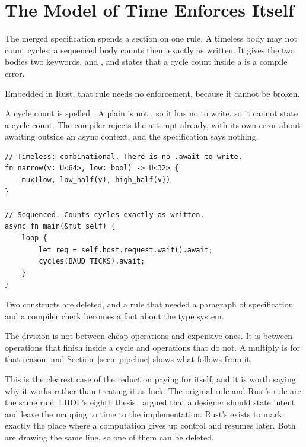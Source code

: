 \section{The Model of Time Enforces Itself}
\label{sec:e-time}

The merged specification spends a section on one rule. A timeless body may
not count cycles; a sequenced body counts them exactly as written. It gives
the two bodies two keywords,  and , and states that a
cycle count inside a  is a compile error.

Embedded in Rust, that rule needs no enforcement, because it cannot be
broken.

A cycle count is spelled . A plain  is not
, so it has no  to write, so it cannot state a
cycle count. The compiler rejects the attempt already, with its own error
about awaiting outside an async context, and the specification says
nothing.

\begin{lstlisting}[caption={The model of time, enforced by the type system. The first function has no \code{.await} to write, so it cannot state a cycle count.},label={lst:time}]
// Timeless: combinational. There is no .await to write.
fn narrow(v: U<64>, low: bool) -> U<32> {
    mux(low, low_half(v), high_half(v))
}

// Sequenced. Counts cycles exactly as written.
async fn main(&mut self) {
    loop {
        let req = self.host.request.wait().await;
        cycles(BAUD_TICKS).await;
    }
}
\end{lstlisting}

Two constructs are deleted, and a rule that needed a paragraph of
specification and a compiler check becomes a fact about the type system.

The division is not between cheap operations and expensive ones. It is
between operations that finish inside a cycle and operations that do not.
A multiply is  for that reason, and
Section~\ref{sec:e-pipeline} shows what follows from it.

This is the clearest case of the reduction paying for itself, and it is
worth saying why it works rather than treating it as luck. The original
rule and Rust's rule are the same rule. LHDL's eighth thesis~\cite{theses}
argued that a designer should state intent and leave the mapping to time to
the implementation. Rust's  exists to mark exactly the place
where a computation gives up control and resumes later. Both are drawing
the same line, so one of them can be deleted.
